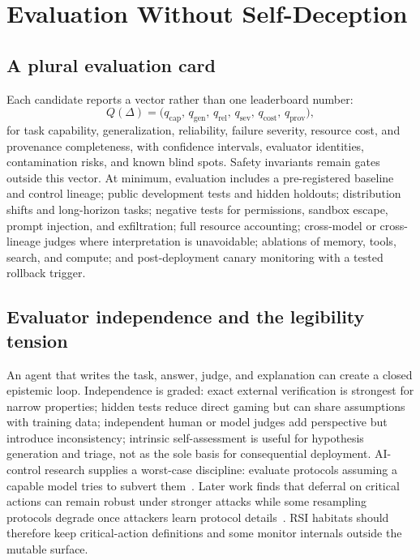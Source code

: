 \documentclass[11pt,a4paper]{article}
\begin{document}
\section{Evaluation Without Self-Deception}\label{sec:eval}
\subsection{A plural evaluation card}
Each candidate reports a vector rather than one leaderboard number:
\begin{equation}
Q(\Delta) = \big(q_{\text{cap}},\, q_{\text{gen}},\, q_{\text{rel}},\, q_{\text{sev}},\, q_{\text{cost}},\, q_{\text{prov}}\big),
\end{equation}
for task capability, generalization, reliability, failure severity, resource cost, and provenance completeness, with confidence intervals, evaluator identities, contamination risks, and known blind spots. Safety invariants remain gates outside this vector. At minimum, evaluation includes a pre-registered baseline and control lineage; public development tests and hidden holdouts; distribution shifts and long-horizon tasks; negative tests for permissions, sandbox escape, prompt injection, and exfiltration; full resource accounting; cross-model or cross-lineage judges where interpretation is unavoidable; ablations of memory, tools, search, and compute; and post-deployment canary monitoring with a tested rollback trigger.

\subsection{Evaluator independence and the legibility tension}
An agent that writes the task, answer, judge, and explanation can create a closed epistemic loop. Independence is graded: exact external verification is strongest for narrow properties; hidden tests reduce direct gaming but can share assumptions with training data; independent human or model judges add perspective but introduce inconsistency; intrinsic self-assessment is useful for hypothesis generation and triage, not as the sole basis for consequential deployment. AI-control research supplies a worst-case discipline: evaluate protocols assuming a capable model tries to subvert them~\cite{greenblatt2023control}. Later work finds that deferral on critical actions can remain robust under stronger attacks while some resampling protocols degrade once attackers learn protocol details~\cite{kutasov2025control}. RSI habitats should therefore keep critical-action definitions and some monitor internals outside the mutable surface.
\end{document}
